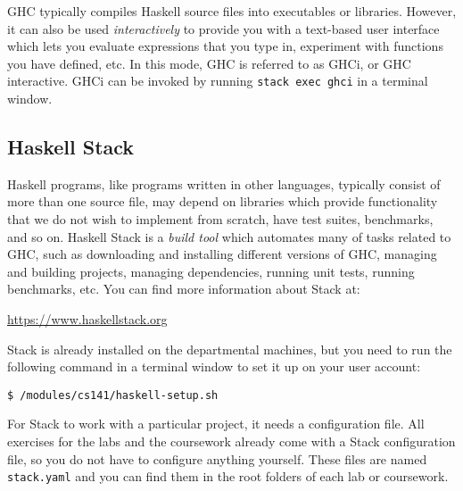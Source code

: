 GHC typically compiles Haskell source files into executables or libraries. However, it can also be used \emph{interactively} to provide you with a text-based user interface which lets you evaluate expressions that you type in, experiment with functions you have defined, etc. In this mode, GHC is referred to as GHCi, or GHC interactive. GHCi can be invoked by running \texttt{\small stack exec ghci} in a terminal window.

\subsection{Haskell Stack} 
\label{sec:stack}

Haskell programs, like programs written in other languages, typically consist of more than one source file, may depend on libraries which provide functionality that we do not wish to implement from scratch, have test suites, benchmarks, and so on. Haskell Stack is a \emph{build tool} which automates many of tasks related to GHC, such as downloading and installing different versions of GHC, managing and building projects, managing dependencies, running unit tests, running benchmarks, etc. You can find more information about Stack at:
\begin{center}
	\url{https://www.haskellstack.org}
\end{center}
Stack is already installed on the departmental machines, but you need to run the following command in a terminal window to set it up on your user account:
\begin{verbatim}
$ /modules/cs141/haskell-setup.sh
\end{verbatim}
For Stack to work with a particular project, it needs a configuration file. All exercises for the labs and the coursework already come with a Stack configuration file, so you do not have to configure anything yourself. These files are named \texttt{\small stack.yaml} and you can find them in the root folders of each lab or coursework.

